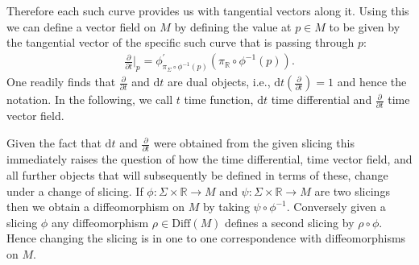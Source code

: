 Therefore each such curve provides us with tangential vectors along it. Using this we can define a vector field on $M$ by defining the value at $p \in M$ to be given by the tangential vector of the specific such curve that is passing through $p$:
\begin{align}
\frac{\partial}{\partial t}\bigg \vert_p = \phi^{\prime}_{\pi_{\Sigma}\circ \phi^{-1}(p)} \left (\pi_{\mathbb{R}}\circ \phi^{-1}(p)\right ).
\end{align}
One readily finds that $\frac{\partial}{\partial t}$ and $\mathrm{d}t$ are dual objects, i.e., $\mathrm{d}t(\frac{\partial}{\partial t}) = 1$ and hence the notation. In the following, we call $t$ time function, $\mathrm{d}t$ time differential and $\frac{\partial}{\partial t}$ time vector field.


Given the fact that $\mathrm{d}t$ and $\frac{\partial}{\partial t}$ were obtained from the given slicing this immediately raises the question of how the time differential, time vector field, and all further objects that will subsequently be defined in terms of these, change under a change of slicing. If $\phi : \Sigma \times \mathbb{R} \rightarrow M $ and $\psi : \Sigma \times \mathbb{R} \rightarrow M$ are two slicings then we obtain a diffeomorphism on $M$ by taking $\psi \circ \phi^{-1}$. Conversely given a slicing $\phi$ any diffeomorphism $\rho \in \mathrm{Diff}(M)$ defines a second slicing by $\rho \circ \phi $. Hence changing the slicing is in one to one correspondence with diffeomorphisms on $M$. 

